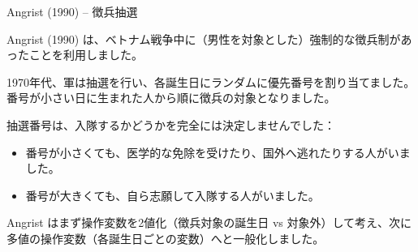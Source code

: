 \documentclass[11pt,handout]{beamer}
\newenvironment{wideitemize}{\itemize\addtolength{\itemsep}{10pt}}{\enditemize}
\begin{document}
\begin{frame}{Angrist (1990) -- 徴兵抽選}
	\begin{wideitemize}
		\item
		Angrist (1990) は、ベトナム戦争中に（男性を対象とした）強制的な徴兵制があったことを利用しました。
		
		\item
		1970年代、軍は抽選を行い、各誕生日にランダムに優先番号を割り当てました。番号が小さい日に生まれた人から順に徴兵の対象となりました。
		
		\pause
		\item
		抽選番号は、入隊するかどうかを完全には決定しませんでした：
		
			\begin{itemize}
				\item 
				番号が小さくても、医学的な免除を受けたり、国外へ逃れたりする人がいました。
				
				\item
				番号が大きくても、自ら志願して入隊する人がいました。
			\end{itemize} 
		
		\pause
		\item
		Angrist はまず操作変数を2値化（徴兵対象の誕生日 vs 対象外）して考え、次に多値の操作変数（各誕生日ごとの変数）へと一般化しました。
	\end{wideitemize}
\end{frame}
\end{document}
